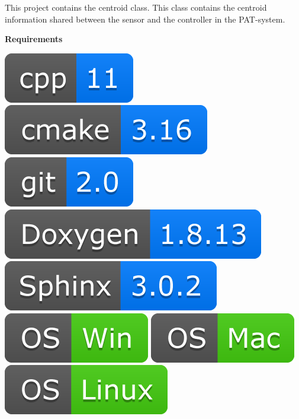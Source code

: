 
This project contains the centroid class. This class contains the
centroid information shared between the sensor and the controller in the
PAT-system.

\textbf{Requirements}

\includegraphics[scale=0.7]{img/shilds/cpp.png}
\includegraphics[scale=0.7]{img/shilds/cmake.png}
\includegraphics[scale=0.7]{img/shilds/git.png}
\includegraphics[scale=0.7]{img/shilds/doxygen.png}
\includegraphics[scale=0.7]{img/shilds/sphinx.png}
\includegraphics[scale=0.7]{img/shilds/win.png}
\includegraphics[scale=0.7]{img/shilds/mac.png}
\includegraphics[scale=0.7]{img/shilds/linux.png}

